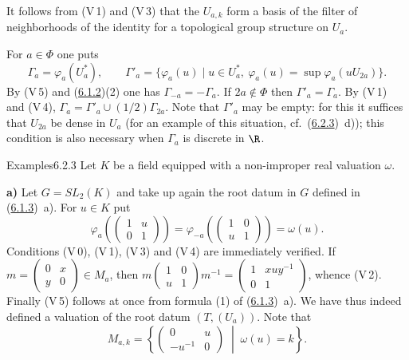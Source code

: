 \documentclass[12pt,a4paper,oneside,english]{smfart}
\makeatletter
\newcommand{\btanchor}[1]{\leavevmode\Hy@raisedlink{\hypertarget{bt:#1}{}}}
\newcommand{\btref}[1]{\hyperlink{bt:#1}{#1}}
\theoremstyle{definition}
\theoremstyle{bt}
\makeatother
\begin{document}
It follows from (V\,1) and (V\,3) that the $U_{a,k}$ form a basis of the filter of
neighborhoods of the identity for a topological group structure on $U_a$.

For $a\in\Phi$ one puts
\[ \Gamma_a=\varphi_a(U_a^{*}),\qquad
   \Gamma'_a=\{\varphi_a(u)\mid u\in U_a^{*},\ \varphi_a(u)=\sup\varphi_a(uU_{2a})\}. \]
By (V\,5) and (\btref{6.1.2})(2) one has $\Gamma_{-a}=-\Gamma_a$. If $2a\notin\Phi$ then
$\Gamma'_a=\Gamma_a$. By (V\,1) and (V\,4),
$\Gamma_a=\Gamma'_a\cup(1/2)\Gamma_{2a}$. Note that $\Gamma'_a$ may be empty: for
this it suffices that $U_{2a}$ be dense in $U_a$ (for an example of this
situation, cf.\ (\btref{6.2.3})~d)); this condition is also necessary when $\Gamma_a$ is
discrete in $\R$.

\begin{stmt}{Examples}{6.2.3}\btanchor{6.2.3}
Let $K$ be a field equipped with a non-improper real valuation $\omega$.
\end{stmt}

\noindent\textbf{a)} Let $G=SL_2(K)$ and take up again the root datum in $G$
defined in (\btref{6.1.3})~a). For $u\in K$ put
\[ \varphi_a\!\left(\begin{pmatrix}1&u\\0&1\end{pmatrix}\right)
 =\varphi_{-a}\!\left(\begin{pmatrix}1&0\\u&1\end{pmatrix}\right)=\omega(u). \]
Conditions (V\,0), (V\,1), (V\,3) and (V\,4) are immediately verified. If
$m=\begin{pmatrix}0&x\\y&0\end{pmatrix}\in M_a$, then
$m\begin{pmatrix}1&0\\u&1\end{pmatrix}m^{-1}
 =\begin{pmatrix}1&xuy^{-1}\\0&1\end{pmatrix}$, whence (V\,2). Finally (V\,5)
follows at once from formula (1) of (\btref{6.1.3})~a). We have thus indeed defined a
valuation of the root datum $(T,(U_a))$. Note that
\begin{equation}
M_{a,k}=\left\{\begin{pmatrix}0&u\\-u^{-1}&0\end{pmatrix}\;\middle|\;\omega(u)=k\right\}.
\end{equation}
\end{document}
